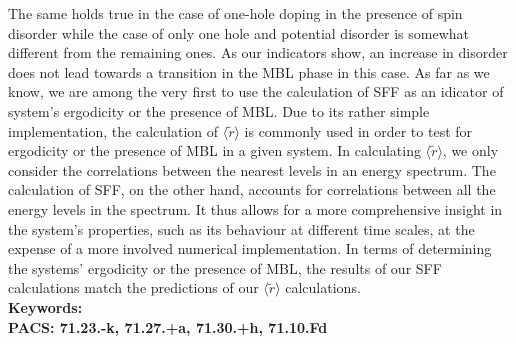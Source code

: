 The same holds true in the case of one-hole doping in the presence of spin disorder while the case of only one hole and potential disorder is somewhat different from the remaining ones. As our indicators show, an increase in disorder does not lead towards a transition in the MBL phase in this case. As far as we know, we are among the very first to use the calculation of SFF as an idicator of system's ergodicity or the presence of MBL. Due to its rather simple implementation, the calculation of $\langle\tilde{r}\rangle$ is commonly used in order to test for ergodicity or the presence of MBL in a given system. In calculating $\langle\tilde{r}\rangle$, we only consider the correlations between the nearest levels in an energy spectrum. The calculation of SFF, on the other hand, accounts for correlations between all the energy levels in the spectrum. It thus allows for a more comprehensive insight in the system's properties, such as its behaviour at different time scales, at the expense of a more involved numerical implementation. In terms of determining the systems' ergodicity or the presence of MBL, the results of our SFF calculations match the predictions of our $\langle\tilde{r}\rangle$ calculations. 
\vspace{1cm}\\
{\bf Keywords:}\\
{\bf PACS: 71.23.-k, 71.27.+a, 71.30.+h, 71.10.Fd}


\tableofcontents


\cleardoublepage{}
\renewcommand\listfigurename{Seznam slik}
\addcontentsline{toc}{chapter}{\listfigurename}
\listoffigures



\cleardoublepage


\pagestyle{fancy}
\fancyhead[CE,RE]{}
\fancyhead[LO,CO]{}
\fancyhead[LE]{\textbf{\nouppercase{\leftmark}}}
\fancyhead[RO]{\textbf{\nouppercase{\rightmark}}}






% 
